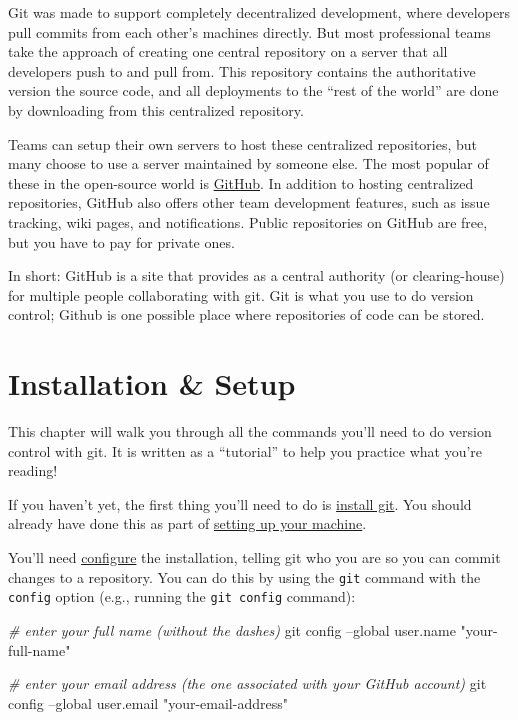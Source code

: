 \documentclass[]{book}
\newenvironment{Shaded}{\begin{snugshade}}{\end{snugshade}}
\newcommand{\StringTok}[1]{\textcolor[rgb]{0.31,0.60,0.02}{#1}}
\newcommand{\CommentTok}[1]{\textcolor[rgb]{0.56,0.35,0.01}{\textit{#1}}}
\newcommand{\FunctionTok}[1]{\textcolor[rgb]{0.00,0.00,0.00}{#1}}
\newcommand{\NormalTok}[1]{#1}
\theoremstyle{definition}
\theoremstyle{definition}
\theoremstyle{remark}
\begin{document}
Git was made to support completely decentralized development, where
developers pull commits from each other's machines directly. But most
professional teams take the approach of creating one central repository
on a server that all developers push to and pull from. This repository
contains the authoritative version the source code, and all deployments
to the ``rest of the world'' are done by downloading from this
centralized repository.

Teams can setup their own servers to host these centralized
repositories, but many choose to use a server maintained by someone
else. The most popular of these in the open-source world is
\href{https://github.com/}{GitHub}. In addition to hosting centralized
repositories, GitHub also offers other team development features, such
as issue tracking, wiki pages, and notifications. Public repositories on
GitHub are free, but you have to pay for private ones.

In short: GitHub is a site that provides as a central authority (or
clearing-house) for multiple people collaborating with git. Git is what
you use to do version control; Github is one possible place where
repositories of code can be stored.

\section{Installation \& Setup}\label{installation-setup}

This chapter will walk you through all the commands you'll need to do
version control with git. It is written as a ``tutorial'' to help you
practice what you're reading!

If you haven't yet, the first thing you'll need to do is
\href{http://git-scm.com/downloads}{install git}. You should already
have done this as part of \protect\hyperlink{setup-machine}{setting up
your machine}.

You'll need
\href{https://help.github.com/articles/set-up-git/}{configure} the
installation, telling git who you are so you can commit changes to a
repository. You can do this by using the \texttt{git} command with the
\texttt{config} option (e.g., running the \texttt{git\ config} command):

\begin{Shaded}
\begin{Highlighting}[]
\CommentTok{# enter your full name (without the dashes)}
\FunctionTok{git}\NormalTok{ config --global user.name }\StringTok{"your-full-name"}

\CommentTok{# enter your email address (the one associated with your GitHub account)}
\FunctionTok{git}\NormalTok{ config --global user.email }\StringTok{"your-email-address"}
\end{Highlighting}
\end{Shaded}
\end{document}
